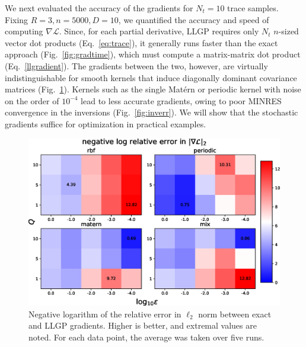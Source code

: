 \documentclass{article}
\def \mcL {\mathcal{L}}
\begin{document}
We next evaluated the accuracy of the gradients for $N_t=10$ trace samples. Fixing $R=3,n=5000,D=10$, we quantified the accuracy and speed of computing $\nabla\mcL$. Since, for each partial derivative, LLGP requires only $N_t$ $n$-sized vector dot products (Eq.~\ref{eq:trace}), it generally runs faster than the exact approach (Fig.~\ref{fig:gradtime}), which must compute a matrix-matrix dot product (Eq.~\ref{llgradient}). The gradients between the two, however, are virtually indistinguishable for smooth kernels that induce diagonally dominant covariance matrices (Fig.~\ref{fig:relgrad}). Kernels such as the single Mat\'{e}rn or periodic kernel with noise on the order of $10^{-4}$ lead to less accurate gradients, owing to poor MINRES convergence in the inversions (Fig.~\ref{fig:inverr}). We will show that the stochastic gradients suffice for optimization in practical examples.

\begin{figure}[!ht]
\vskip 0.2in
\begin{center}
\centerline{\includegraphics[width=\columnwidth]{relgrad_l2.eps}}
\caption{Negative logarithm of the relative error in $\ell_2$ norm between exact and LLGP gradients. Higher is better, and extremal values are noted.  For each data point, the average was taken over five runs.}
\label{fig:relgrad}
\end{center}
\vskip -0.2in
\end{figure}
\end{document}
